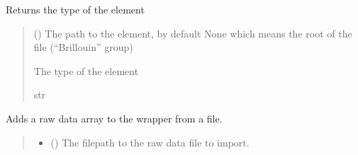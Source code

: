 \documentclass[letterpaper,10pt,english]{sphinxmanual}
\begin{document}
\begin{fulllineitems}
\begin{fulllineitems}
\label{\detokenize{source/HDF5_BLS:HDF5_BLS.wrapper.Wrapper.get_type}}
\pysigstartsignatures
\pysiglinewithargsret
{}
{\sphinxparamcomma {}}
{}
\pysigstopsignatures
\sphinxAtStartPar
Returns the type of the element
\begin{quote}\begin{description}
\sphinxAtStartPar
{} (\sphinxstyleliteralemphasis{\sphinxupquote{, }}) \textendash{} The path to the element, by default None which means the root of the file (“Brillouin” group)

\sphinxAtStartPar
The type of the element

\sphinxAtStartPar
str

\end{description}\end{quote}

\end{fulllineitems}


\begin{fulllineitems}
\label{\detokenize{source/HDF5_BLS:HDF5_BLS.wrapper.Wrapper.import_other}}
\pysigstartsignatures
\pysiglinewithargsret
{}
{\sphinxparamcomma {}\sphinxparamcomma {}\sphinxparamcomma {}\sphinxparamcomma {}\sphinxparamcomma {}\sphinxparamcomma {}}
{}
\pysigstopsignatures
\sphinxAtStartPar
Adds a raw data array to the wrapper from a file.
\begin{quote}\begin{description}
\begin{itemize}
\item {} 
\sphinxAtStartPar
{} () \textendash{} The filepath to the raw data file to import.


\end{itemize}
\end{description}
\end{quote}
\end{fulllineitems}
\end{fulllineitems}
\end{document}
